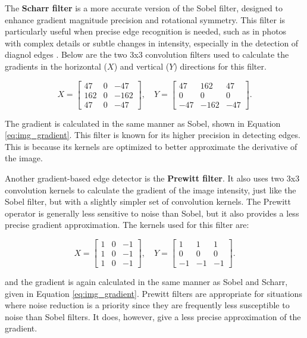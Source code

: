 \documentclass[%
	a4paper, %
	12pt, %
	english, %
	bibtotoc %
]{scrartcl}
\begin{document}
The \textbf{Scharr filter} is a more accurate version of the Sobel filter, designed to enhance gradient magnitude precision and rotational symmetry. This filter is particularly useful when precise edge recognition is needed, such as in photos with complex details or subtle changes in intensity, especially in the detection of diagnol edges . Below are the two 3x3 convolution filters used to calculate the gradients in the horizontal (\(X\)) and vertical (\(Y\)) directions for this filter.

\begin{equation}
X = 
\begin{bmatrix}
47 & 0 & -47 \\
162 & 0 & -162 \\
47 & 0 & -47
\end{bmatrix},
\quad
Y = 
\begin{bmatrix}
47 & 162 & 47 \\
0 & 0 & 0 \\
-47 & -162 & -47
\end{bmatrix}.
\end{equation}

The gradient is calculated in the same manner as Sobel, shown in Equation \ref{eq:img_gradient}. This  filter is known for its higher precision in detecting edges. This is because its kernels are optimized to better approximate the derivative of the image.

Another gradient-based edge detector is the \textbf{Prewitt filter}. It also uses two 3x3 convolution kernels to calculate the gradient of the image intensity, just like the Sobel filter, but with a slightly simpler set of convolution kernels. The Prewitt operator is generally less sensitive to noise than Sobel, but it also provides a less precise gradient approximation. The kernels used for this filter are:

\begin{equation}
X = 
\begin{bmatrix}
1 & 0 & -1 \\
1 & 0 & -1 \\
1 & 0 & -1
\end{bmatrix},
\quad
Y = 
\begin{bmatrix}
1 & 1 & 1 \\
0 & 0 & 0 \\
-1 & -1 & -1
\end{bmatrix}.
\end{equation}

and the gradient is again calculated in the same manner as Sobel and Scharr, given in Equation \ref{eq:img_gradient}. Prewitt filters are appropriate for situations where noise reduction is a priority since they are frequently less susceptible to noise than Sobel filters. It does, however, give a less precise approximation of the gradient.
\end{document}
